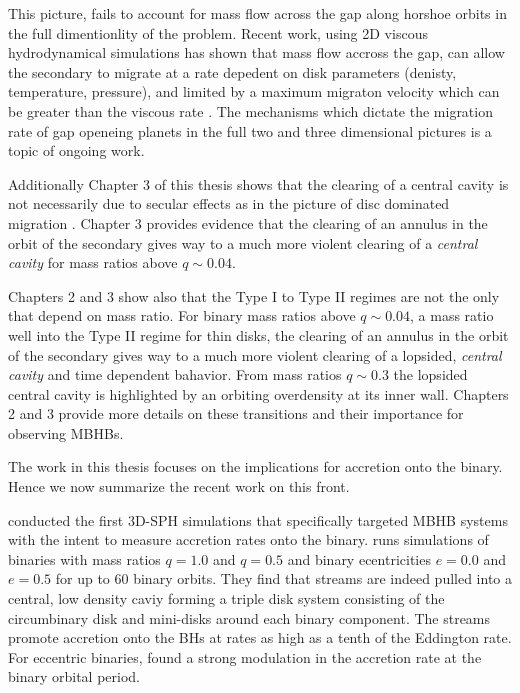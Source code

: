 This picture, fails to account for mass flow across the gap along
horshoe orbits in the full dimentionlity of the problem. Recent work, using 2D
viscous hydrodynamical simulations has shown that mass flow accross the gap,
can allow the secondary to migrate at a rate depedent on disk parameters
(denisty, temperature, pressure), and limited by a maximum migraton velocity
which can be greater than the viscous rate \citep{Edgar:2008, DuffellFTV:2014,
DurmannKley:2015}. The mechanisms which dictate the migration rate of gap
openeing planets in the full two and three dimensional pictures is a topic of
ongoing work.


Additionally Chapter 3 of this thesis shows that the clearing of a central
cavity is not necessarily due to secular effects as in the picture of disc
dominated migration \cite{SyerClarke95}. Chapter 3 provides evidence that
the clearing of an annulus in the orbit of the secondary gives way to a much
more violent clearing of a \emph{central cavity} for mass ratios above $q
\sim0.04$.

Chapters 2 and 3 show also that the Type I to Type II regimes are not the only
that depend on mass ratio. For binary mass ratios above $q\sim0.04$, a mass
ratio well into the Type II regime for thin disks, the clearing of an annulus
in the orbit of the secondary gives way to a much more violent clearing of a
lopsided, \emph{central cavity} and time dependent bahavior. From mass ratios
$q \sim 0.3$ the lopsided central cavity is highlighted by an orbiting
overdensity at its inner wall. Chapters 2 and 3 provide more details on these
transitions and their importance for observing MBHBs.




The work in this thesis focuses on the implications for accretion onto the binary. Hence we now summarize the recent work on this front.


\cite{Haysaki:2007} conducted the first 3D-SPH simulations that specifically
targeted MBHB systems with the intent to measure accretion rates onto the
binary. \cite{Haysaki:2007} runs simulations of binaries with mass ratios
$q=1.0$ and $q=0.5$ and binary ecentricities $e=0.0$ and $e=0.5$ for up to 60
binary orbits. They find that streams are indeed pulled into a central, low
density caviy forming a triple disk system \citep{Hayasaki+2008} consisting of
the circumbinary disk and mini-disks around each binary component. The streams
promote accretion onto the BHs at rates as high as a tenth of the Eddington
rate. For eccentric binaries, \cite{Haysaki:2007} found a strong modulation in
the accretion rate at the binary orbital period. 

